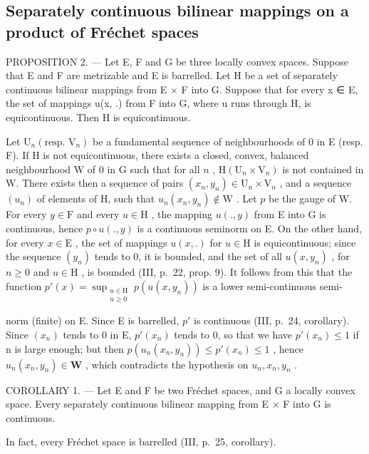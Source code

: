 \subsection{Separately continuous bilinear mappings on a product of Fréchet spaces}

PROPOSITION 2. --- Let E, F and G be three locally convex spaces. Suppose that E and F are metrizable and E is barrelled. Let H be a set of separately continuous bilinear mappings from E × F into G. Suppose that for every x ∈ E, the set of mappings u(x, .) from F into G, where u runs through H, is equicontinuous. Then H is equicontinuous.

Let \(\mathrm{U}_n(\text{resp. } \mathrm{V}_n)\) be a fundamental sequence of neighbourhoods of 0 in E (resp. F). If H is not equicontinuous, there exists a closed, convex, balanced neighbourhood W of 0 in G such that for all \(n\) , \(\mathrm{H}(\mathrm{U}_n \times \mathrm{V}_n)\) is not contained in W. There exists then a sequence of pairs \((x_n, y_n) \in \mathrm{U}_n \times \mathrm{V}_n\) , and a sequence \((u_n)\) of elements of H, such that \(u_n(x_n, y_n) \notin \mathrm{W}\) . Let \(p\) be the gauge of W. For every \(y \in \mathrm{F}\) and every \(u \in \mathrm{H}\) , the mapping \(u(., y)\) from E into G is continuous, hence \(p \circ u(., y)\) is a continuous seminorm on E. On the other hand, for every \(x \in \mathrm{E}\) , the set of mappings \(u(x, .)\) for \(u \in \mathrm{H}\) is equicontinuous; since the sequence \((y_n)\) tends to 0, it is bounded, and the set of all \(u(x, y_n)\) , for \(n \geqslant 0\) and \(u \in \mathrm{H}\) , is bounded (III, p.~22, prop. 9). It follows from this that the function \(p'(x) = \sup_{\substack{u \in \mathrm{H} \\ n \geqslant 0}} p(u(x, y_n))\) is a lower semi-continuous semi-

norm (finite) on E. Since E is barrelled, \(p'\) is continuous (III, p.~24, corollary). Since \((x_{n})\) tends to 0 in E, \(p'(x_{n})\) tends to 0, so that we have \(p'(x_{n}) \leqslant 1\) if n is large enough; but then \(p(u_{n}(x_{n}, y_{n})) \leqslant p'(x_{n}) \leqslant 1\) , hence \(u_{n}(x_{n}, y_{n}) \in \mathbf{W}\) , which contradicts the hypothesis on \(u_{n}, x_{n}, y_{n}\) .

COROLLARY 1. --- Let E and F be two Fréchet spaces, and G a locally convex space. Every separately continuous bilinear mapping from E × F into G is continuous.

In fact, every Fréchet space is barrelled (III, p.~25, corollary).

